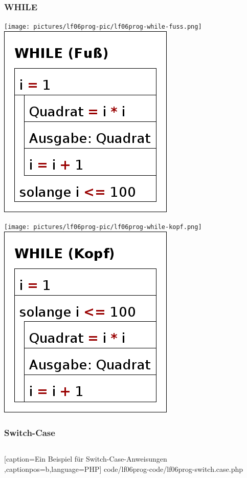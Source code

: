 \subsubsection{WHILE}

\texttt{[image: pictures/lf06prog-pic/lf06prog-while-fuss.png]}
\includegraphics[scale=0.4]{pictures/lf06prog-pic/lf06prog-while-fuss-struct.png}

\texttt{[image: pictures/lf06prog-pic/lf06prog-while-kopf.png]}
\includegraphics[scale=0.4]{pictures/lf06prog-pic/lf06prog-while-kopf-struct.png}

\subsubsection{Switch-Case}
\begin{tabular}{l|l|l}

\end{tabular}

	[caption={Ein Beispiel für Switch-Case-Anweisungen}
	\label{lst:Switch-Case},captionpos=b,language=PHP]
	{code/lf06prog-code/lf06prog-switch.case.php}

